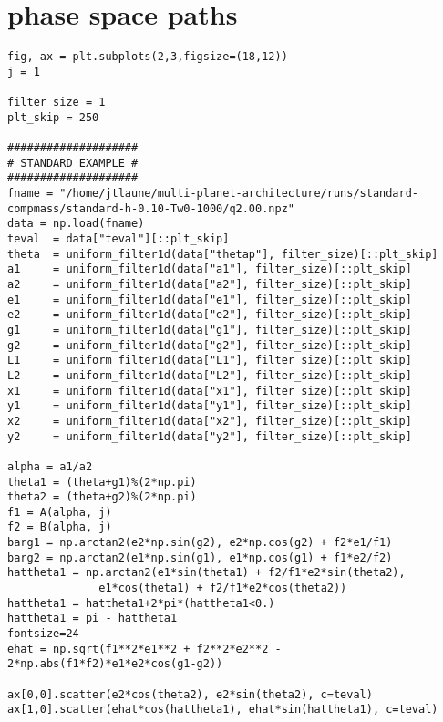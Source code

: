 \documentclass[11pt]{article}
\begin{document}
\section{phase space paths}
\label{sec:org6169639}
\begin{verbatim}
fig, ax = plt.subplots(2,3,figsize=(18,12))
j = 1

filter_size = 1
plt_skip = 250

####################
# STANDARD EXAMPLE #
####################
fname = "/home/jtlaune/multi-planet-architecture/runs/standard-compmass/standard-h-0.10-Tw0-1000/q2.00.npz"
data = np.load(fname)
teval  = data["teval"][::plt_skip]
theta  = uniform_filter1d(data["thetap"], filter_size)[::plt_skip]
a1     = uniform_filter1d(data["a1"], filter_size)[::plt_skip]
a2     = uniform_filter1d(data["a2"], filter_size)[::plt_skip]
e1     = uniform_filter1d(data["e1"], filter_size)[::plt_skip]     
e2     = uniform_filter1d(data["e2"], filter_size)[::plt_skip]
g1     = uniform_filter1d(data["g1"], filter_size)[::plt_skip]     
g2     = uniform_filter1d(data["g2"], filter_size)[::plt_skip]
L1     = uniform_filter1d(data["L1"], filter_size)[::plt_skip]     
L2     = uniform_filter1d(data["L2"], filter_size)[::plt_skip]
x1     = uniform_filter1d(data["x1"], filter_size)[::plt_skip]     
y1     = uniform_filter1d(data["y1"], filter_size)[::plt_skip]
x2     = uniform_filter1d(data["x2"], filter_size)[::plt_skip]     
y2     = uniform_filter1d(data["y2"], filter_size)[::plt_skip]

alpha = a1/a2
theta1 = (theta+g1)%(2*np.pi)
theta2 = (theta+g2)%(2*np.pi)
f1 = A(alpha, j)
f2 = B(alpha, j)
barg1 = np.arctan2(e2*np.sin(g2), e2*np.cos(g2) + f2*e1/f1)
barg2 = np.arctan2(e1*np.sin(g1), e1*np.cos(g1) + f1*e2/f2)
hattheta1 = np.arctan2(e1*sin(theta1) + f2/f1*e2*sin(theta2),
		      e1*cos(theta1) + f2/f1*e2*cos(theta2))
hattheta1 = hattheta1+2*pi*(hattheta1<0.)
hattheta1 = pi - hattheta1
fontsize=24
ehat = np.sqrt(f1**2*e1**2 + f2**2*e2**2 - 2*np.abs(f1*f2)*e1*e2*cos(g1-g2))

ax[0,0].scatter(e2*cos(theta2), e2*sin(theta2), c=teval)
ax[1,0].scatter(ehat*cos(hattheta1), ehat*sin(hattheta1), c=teval)


\end{verbatim}
\end{document}
